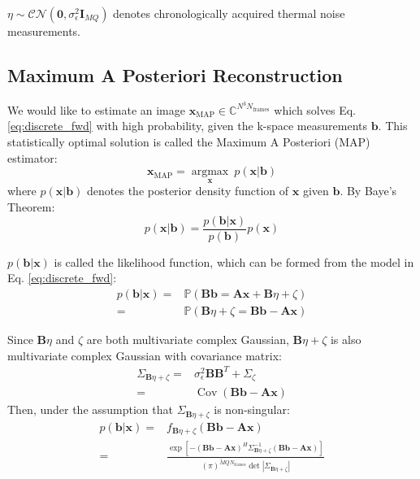 \documentclass[11pt]{article}
\begin{document}
$\eta \sim \mathcal{CN}(\mathbf{0},\sigma_\epsilon^2\mathbf{I}_{MQ})$ denotes chronologically acquired thermal noise measurements.

\subsection{Maximum A Posteriori Reconstruction}
We would like to estimate an image $\mathbf{x}_\mathrm{MAP} \in \mathbb{C}^{N^3N_\mathrm{frames}}$ which solves Eq. \ref{eq:discrete_fwd} with high probability, given the k-space measurements $\mathbf{b}$.
This statistically optimal solution is called the Maximum A Posteriori (MAP) estimator:
\begin{equation} \label{eq:map_estimator}
    \mathbf{x}_\mathrm{MAP} = \underset{\mathbf{x}}{\operatorname{argmax}}\ p(\mathbf{x} | \mathbf{b})
\end{equation}
where $p(\mathbf{x} | \mathbf{b})$ denotes the posterior density function of $\mathbf{x}$ given $\mathbf{b}$.
By Baye's Theorem:
\begin{equation*}
    p(\mathbf{x} |\mathbf{b}) = \frac{p(\mathbf{b} | \mathbf{x})}{p(\mathbf{b})}p(\mathbf{x})
\end{equation*}

$p(\mathbf{b} |\mathbf{x})$ is called the likelihood function, which can be formed from the model in Eq. \ref{eq:discrete_fwd}:
\begin{align*}
    p(\mathbf{b} | \mathbf{x}) = &\mathbb{P} (\mathbf{B}\mathbf{b} =\mathbf{A}\mathbf{x} + \mathbf{B}\eta + \zeta) \\
    = &\mathbb{P}(\mathbf{B} \eta + \zeta = \mathbf{B} \mathbf{b} - \mathbf{A}\mathbf{x})
\end{align*}

Since $\mathbf{B} \eta$ and $\zeta$ are both multivariate complex Gaussian, $\mathbf{B} \eta+\zeta$ is also multivariate complex Gaussian  with covariance matrix:
\begin{equation} \label{eq:noise_covariance}
    \begin{aligned}
        \Sigma_{\mathbf{B} \eta+ \zeta} = &\sigma_{\epsilon}^2 \mathbf{B} \mathbf{B}^T + \Sigma_\zeta  \\
        = & \operatorname{Cov}(\mathbf{B} \mathbf{b} - \mathbf{A}\mathbf{x})
    \end{aligned}
\end{equation}
Then, under the assumption that $\Sigma_{\mathbf{B} \eta+ \zeta}$ is non-singular:
\begin{align*}
    p(\mathbf{b} | \mathbf{x}) = &f_{\mathbf{B} \eta+ \zeta} \left( \mathbf{B} \mathbf{b} - \mathbf{A}\mathbf{x} \right) \\
    = & \frac{\exp\left[ - (\mathbf{B} \mathbf{b} - \mathbf{A}\mathbf{x})^H \Sigma_{\mathbf{B} \eta+ \zeta} ^{-1}(\mathbf{B} \mathbf{b} - \mathbf{A}\mathbf{x})\right]}{(\pi)^{\tilde{M}QN_\mathrm{frames}} \det{ |\Sigma_{\mathbf{B} \eta+ \zeta}|}}
\end{align*}
\end{document}
